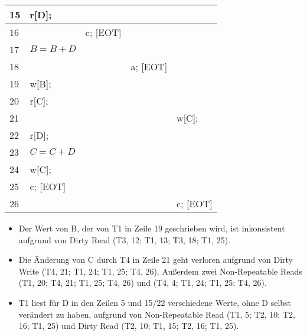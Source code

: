 \begin{tabular}{ | p{1cm} | p{2.8cm} | p{2.8cm} | p{2.8cm} | p{2.8cm} | }
	15            & r[D];        &              &              &              \\ \hline
	16            &              & c; [EOT]     &              &              \\ \hline
	17            & $B = B + D$  &              &              &              \\ \hline
	18            &              &              & a; [EOT]     &              \\ \hline
	19            & w[B];        &              &              &              \\ \hline
	20            & r[C];        &              &              &              \\ \hline
	21            &              &              &              & w[C];        \\ \hline
	22            & r[D];        &              &              &              \\ \hline
	23            & $C = C + D$  &              &              &              \\ \hline
	24            & w[C];        &              &              &              \\ \hline
	25            & c; [EOT]     &              &              &              \\ \hline
	26            &              &              &              & c; [EOT]     \\ \hline
\end{tabular}

\begin{solution}
	\begin{itemize}
		\item Der Wert von B, der von T1 in Zeile 19 geschrieben wird, ist inkonsistent aufgrund von Dirty Read (T3, 12; T1, 13; T3, 18; T1, 25).
		\item Die Änderung von C durch T4 in Zeile 21 geht verloren aufgrund von Dirty Write (T4, 21; T1, 24; T1, 25; T4, 26). Außerdem zwei Non-Repeatable Reads (T1, 20; T4, 21; T1, 25; T4, 26) und (T4, 4; T1, 24; T1, 25; T4, 26).
		\item T1 liest für D in den Zeilen 5 und 15/22 verschiedene Werte, ohne D selbst verändert zu haben, aufgrund von Non-Repeatable Read (T1, 5; T2, 10; T2, 16; T1, 25) und Dirty Read (T2, 10; T1, 15; T2, 16; T1, 25).
	\end{itemize}
\end{solution}
